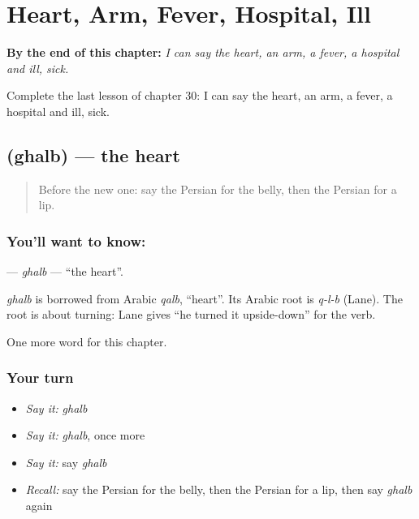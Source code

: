 
\chapter{Heart, Arm, Fever, Hospital, Ill}
\label{ch:fa-heart-arm-fever-hospital-ill}

\begin{chapteropening}
\textbf{By the end of this chapter:} \emph{I can say the heart, an arm, a fever, a hospital and ill, sick.}

Complete the last lesson of chapter 30: I can say the heart, an arm, a fever, a hospital and ill, sick.
\end{chapteropening}

\section[\texorpdfstring{\fa{قلب} (ghalb)}{قلب (ghalb)}]{ (ghalb) — the heart}

\label{lesson:FA-C30-ghalb}



\begin{quote}
Before the new one: say the Persian for the belly, then the Persian for a lip.
\end{quote}

\subsection*{You'll want to know: }
\textbf{} — \emph{ghalb} — \textquotedblleft{}the heart\textquotedblright{}.

\begin{cousinweb}
\emph{ghalb} is borrowed from Arabic \emph{qalb}, \textquotedblleft{}heart\textquotedblright{}. Its Arabic root is \emph{q-l-b} (Lane). The root is about turning: Lane gives \textquotedblleft{}he turned it upside-down\textquotedblright{} for the verb.
\end{cousinweb}

\begin{grammarlens}[title={What you've built}]
One more word for this chapter.
\end{grammarlens}

\subsection*{Your turn}
\begin{itemize}
\raggedright
  \item \emph{Say it:} \emph{ghalb}
  \item \emph{Say it:} \emph{ghalb}, once more
  \item \emph{Say it:} say \emph{ghalb}
  \item \emph{Recall:} say the Persian for the belly, then the Persian for a lip, then say \emph{ghalb} again
\end{itemize}


